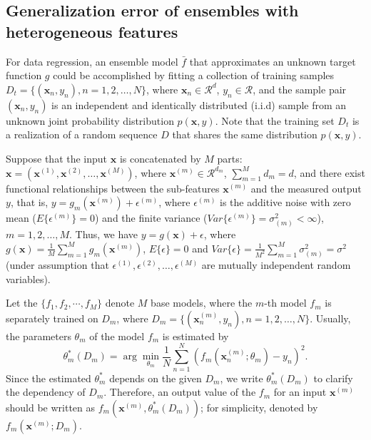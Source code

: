 \documentclass{article}
\begin{document}
\subsection{Generalization error of ensembles with heterogeneous features} 
For data regression, an ensemble model $\bar{f}$ that approximates an unknown target function $g$ could be accomplished by fitting a collection of training samples $D_t = \{(\bm{x}_n,y_n),n=1,2,\dots,N\} $, where $\bm{x}_n  \in \mathcal{R}^{d}$, $y_n \in \mathcal{R}$, and the sample pair $(\bm{x}_n, y_n)$ is an independent and identically distributed (i.i.d) sample from an unknown joint probability distribution $p(\bm{x}, y)$.
Note that the training set $D_t$ is a realization of a random sequence $D$ that shares the same distribution $p(\bm{x}, y)$.

Suppose that the input $\bm{x}$ is concatenated by $M$ parts:
$\bm{x} = (\bm{x}^{(1)},\bm{x}^{(2)},\dots,\bm{x}^{(M)} )$, where $\bm{x}^{(m)} \in \mathcal{R}^{d_m}$, $\sum_{m=1}^M d_m = d$, 
and there exist functional relationships between the sub-features $\bm{x}^{(m)}$ and the measured output $y$, that is,  $ y= g_m(\bm{x}^{(m)})+\epsilon^{(m)}$, where $\epsilon^{(m)}$ is the additive noise with zero mean ($E\{\epsilon^{(m)}\} = 0$) and the finite variance ($\textit{Var}\{\epsilon^{(m)}\} = \sigma_{(m)}^2 < \infty$), $m=1,2,\dots, M$.
Thus, we have $y= g(\bm{x}) +\epsilon$, where $g(\bm{x}) = \frac{1}{M} \sum_{m=1}^M g_m( \bm{x}^{(m)} )$, $E\{\epsilon\} = 0$ and $\textit{Var} \{\epsilon \} = \frac{1}{M^2}\sum_{m=1}^M\sigma^2_{(m)} = \sigma^2 $ (under assumption that $\epsilon^{(1)},\epsilon^{(2)},\dots,\epsilon^{(M)}$  are mutually independent random variables). 

Let the $\{f_1, f_2,\cdots,f_M\}$ denote $M$ base models, where the $m$-th model $f_m$ is separately trained on $D_m$, where $D_m =\{(\bm{x}_n^{(m)},y_n), n=1,2,\dots,N\}$.
Usually, the parameters $\theta_m$ of the model $f_m$ is estimated by 
\begin{equation}
\theta_m^*(D_m) = \arg \min_{\theta_m} \frac{1}{N} \sum_{n=1}^{N}(f_m(\bm{x}_n^{(m)}; \theta_m) - y_n)^2.
\end{equation} 
Since the estimated $\theta_m^*$ depends on the given $D_m$, we write $\theta_m^*(D_m)$ to clarify the dependency of $D_m$. 
Therefore, an output value of the $f_m$ for an input $\bm{x}^{(m)}$ should be written as $f_m(\bm{x}^{(m)}, \theta_m^*(D_m))$; 
for simplicity, denoted by $f_m(\bm{x}^{(m)}; D_m)$.
 
\end{document}
